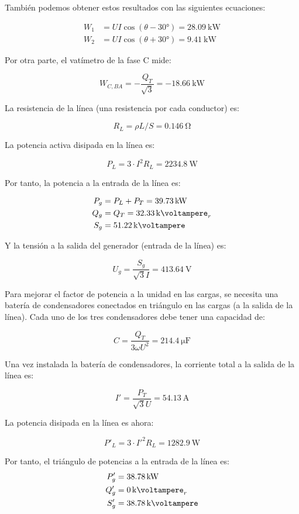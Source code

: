 También podemos obtener estos resultados con las siguientes
ecuaciones:

\begin{align*}
  W_1 &= U I \cos(\theta - \ang{30}) = \SI{28.09}{\kilo\watt}\\
  W_2 &= U I \cos(\theta + \ang{30}) = \SI{9.41}{\kilo\watt}
\end{align*}

Por otra parte, el vatímetro de la fase C mide:

\[
  W_{C, BA} = - \frac{Q_T}{\sqrt{3}} = - \SI{18.66}{\kilo\watt}
\]

La resistencia de la línea (una resistencia por cada conductor) es:

\[
R_L = \rho L/S = \SI{0.146}{\ohm}
\]

La potencia activa disipada en la línea es:

\[
P_L = 3 \cdot I^2 R_L = \SI{2234.8}{\watt}
\]

Por tanto, la potencia a la entrada de la línea es:

\begin{align*}
P_g &= P_L + P_T = \SI{39.73}{\kilo\watt}\\
Q_g &= Q_T = \SI{32.33}{\kilo\voltampere}_r\\
S_g &= \SI{51.22}{\kilo\voltampere}
\end{align*}

Y la tensión a la salida del generador (entrada de la línea) es:

\[
U_g = \frac{S_g}{\sqrt{3} I} = \SI{413.64}{\volt}
\]

Para mejorar el factor de potencia a la unidad en las cargas, se necesita una batería de condensadores conectados en triángulo en las cargas (a la salida de la línea). Cada uno de los tres condensadores debe tener una capacidad de:

\[
C = \frac{Q_T}{3 \omega U^2} = \SI{214.4}{\micro\farad}
\]

Una vez instalada la batería de condensadores, la corriente total a la salida de la línea es:

\[
I' = \frac{P_T}{\sqrt{3} U} = \SI{54.13}{\ampere}
\]

La potencia disipada en la línea es ahora:

\[
P'_L = 3 \cdot I'^2 R_L = \SI{1282.9}{\watt} 
\]

Por tanto, el triángulo de potencias a la entrada de la línea es:
\begin{align*}
P'_g &= \SI{38.78}{\kilo\watt}\\
Q'_g &= \SI{0}{\kilo\voltampere}_r\\
S'_g &= \SI{38.78}{\kilo\voltampere}
\end{align*}

